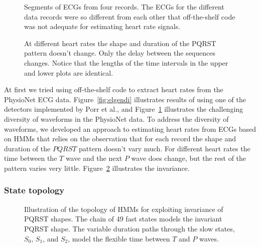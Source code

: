 \begin{figure}
  \caption[Segments of ECGs from four records]%
  {Segments of ECGs from four records.  The ECGs for the different
    data records were so different from each other that off-the-shelf
    code was not adequate for estimating heart rate signals.}
  \label{fig:a03a10b03c02}
\end{figure}

\begin{figure}
  \caption[Invariant PQRST shape]%
  {At different heart rates the shape and duration of the PQRST
    pattern doesn’t change. Only the delay between the sequences
    changes.  Notice that the lengths of the time intervals in the
    upper and lower plots are identical.}
  \label{fig:constant_a03}
\end{figure}

At first we tried using off-the-shelf code to extract heart rates from
the PhysioNet ECG data.  Figure~\ref{fig:elgendi} illustrates results
of using one of the detectors\cite{Elgendi2010} implemented by Porr et
al.\cite{py-ecg-detectors}, and Figure~\ref{fig:a03a10b03c02}
illustrates the challenging diversity of waveforms in the PhysioNet
data.  To address the diversity of waveforms, we developed an approach
to estimating heart rates from ECGs based on HMMs that relies on the
observation that for each record the shape and duration of the $PQRST$
pattern doesn't vary much.  For different heart rates the time between
the $T$ wave and the next $P$ wave does change, but the rest of the
pattern varies very little.  Figure~\ref{fig:constant_a03} illustrates
the invariance.

\subsubsection{State topology}
\label{sec:state_topology}

\begin{figure}
  \centering{\resizebox{0.5\textwidth}{!}{}
  }
  \caption[Topology of HMMs for exploiting invariance of PQRST
  shapes]{Illustration of the topology of HMMs for exploiting
    invariance of PQRST shapes. The chain of 49 fast states models the
    invariant PQRST shape.  The variable duration paths through the
    slow states, $S_0$, $S_1$, and $S_2$, model the flexible time
    between $T$ and $P$ waves.}
  \label{fig:ecg_hmm}
\end{figure}

